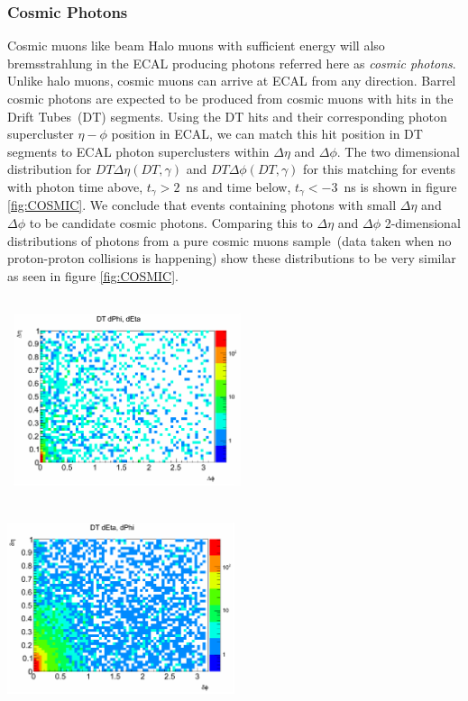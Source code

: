 \subsubsection{Cosmic Photons}
Cosmic muons like beam Halo muons with sufficient energy  will also bremsstrahlung in the ECAL producing photons referred here as \textit{cosmic photons}. Unlike halo muons, cosmic muons can arrive at ECAL from any direction. Barrel cosmic photons  are expected to be produced from cosmic muons with hits in the Drift Tubes~(DT) segments. Using the DT hits and their corresponding  photon supercluster $\eta-\phi$ position in ECAL, we can match this  hit position in DT segments to ECAL photon superclusters within $\Delta\eta$ and $\Delta\phi$. The two dimensional distribution for $DT\Delta\eta(DT,\gamma)$ and $DT\Delta\phi(DT,\gamma)$ for this matching for events with photon time above, $t_{\gamma} > 2$~ns and time below, $t_{\gamma} < -3$~ns is shown in figure \ref{fig:COSMIC}. We conclude that events containing photons with small $\Delta\eta$ and $\Delta\phi$ to be candidate cosmic photons. Comparing this to $\Delta\eta$  and $\Delta\phi$ 2-dimensional distributions of photons from a pure cosmic muons sample~(data taken when no proton-proton collisions is happening) show these distributions to be very similar as seen in figure \ref{fig:COSMIC}.

\begin{center}
\centering
\mbox{
\includegraphics[height=6cm, width=0.5\textwidth]{THESISPLOTS/Cosmic_Ray_Photons_Data.png}
\includegraphics[height=6cm, width=0.5\textwidth]{THESISPLOTS/Cosmic_Ray_Photons_Cosmic_dataset.png} }
\label{fig:COSMIC}
\end{center}

